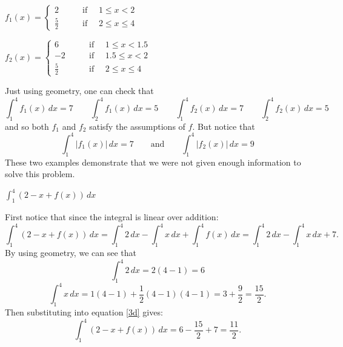 \documentclass[nooutcomes]{ximera}
\renewenvironment{freeResponse}{
\ifhandout\setbox0\vbox\bgroup\else
\begin{trivlist}\item[\hskip \labelsep\bfseries Solution:\hspace{2ex}]
\fi}
{\ifhandout\egroup\else
\end{trivlist}
\fi}
\renewcommand{\d}{\,d}
\begin{document}
\begin{problem}
\begin{enumerate}
\begin{freeResponse}
		$f_1(x) =   \left\{ \begin{array}{cl}
	2		 	&	\qquad \text{if } \quad 1 \leq x < 2					\\
	\frac{5}{2}		&	\qquad \text{if } \quad 2 \leq x \leq 4		\end{array} \right.  $
	
	$f_2(x) =   \left\{ \begin{array}{cl}
	6		 	&	\qquad \text{if } \quad 1 \leq x < 1.5					\\
	-2		 	&	\qquad \text{if } \quad 1.5 \leq x < 2					\\
	\frac{5}{2}		&	\qquad \text{if } \quad 2 \leq x \leq 4		\end{array} \right.  $
	
	Just using geometry, one can check that
	$$ \int_1^4 f_1(x)\d x = 7	\qquad	\int_2^4 f_1(x)\d x = 5	\qquad	\int_1^4 f_2(x)\d x = 7	\qquad	\int_2^4 f_2(x)\d x = 5 $$
	and so both $f_1$ and $f_2$ satisfy the assumptions of $f$.  But notice that
	$$\int_1^4 \left| f_1(x) \right| \d x = 7	\qquad	\text{and}		\qquad	\int_1^4 \left| f_2(x) \right| \d x = 9  $$
	These two examples demonstrate that we were not given enough information to solve this problem.
		
		\end{freeResponse}
		
	\item  $\int_1^4 \left( 2 - x + f(x) \right) \d x$
		\begin{freeResponse}
		First notice that since the integral is linear over addition:
			\begin{equation}\label{3d}
			\int_1^4 \left( 2 - x + f(x) \right) \d x = \int_1^4 2 \d x - \int_1^4 x \d x + \int_1^4 f(x) \d x = \int_1^4 2 \d x - \int_1^4 x \d x + 7.
			\end{equation}
		By using geometry, we can see that
			\begin{equation*}
			\int_1^4 2 \d x = 2(4-1) = 6
			\end{equation*}
			\begin{equation*}
			\int_1^4 x \d x = 1(4-1) + \frac{1}{2} (4-1)(4-1) = 3 + \frac{9}{2} = \frac{15}{2}.
			\end{equation*}
		Then substituting into equation \eqref{3d} gives:
			\begin{equation*}
			\int_1^4 \left( 2 - x + f(x) \right) \d x = 6 - \frac{15}{2} + 7 = \frac{11}{2}.
			\end{equation*}
		\end{freeResponse}
	\end{enumerate}
\end{problem}
\end{document}
